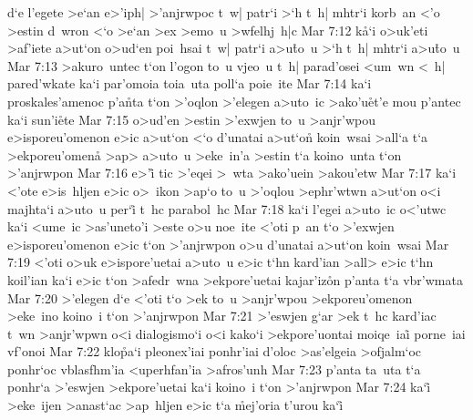 d`e
l'egete
>e`an
e>'iph|
>'anjrwpoc
t~w|
patr`i
>`h
t~h|
mhtr`i
korb~an
<'o
>estin
d~wron
<`o
>e`an
>ex
>emo~u
>wfelhj~h|c\bibvsend
\vs Mar 7:12
k\r{a}`i
o>uk'eti
>af'iete
a>ut`on
o>ud`en
poi~hsai
t~w|
patr`i
a>u\r{t}o~u
>`h
t~h|
mhtr`i
a>u\r{t}o~u\bibvsend
\vs Mar 7:13
>akuro~untec
t`on
l'ogon
to~u
vjeo~u
t~h|
parad'osei
<um~wn
<~h|
pared'wkate
ka`i
par'omoia
toia~uta
poll`a
poie~ite\bibvsend
\vs Mar 7:14
ka`i
proskales'amenoc
p'a\r{n}ta
t`on
>'oqlon
>'elegen
a>uto~ic
>ako'u\r{e}t'e
mou
p'antec
ka`i
sun'i\r{e}te\bibvsend
{}
\vs Mar 7:15
o>ud'en
>estin
>'exwjen
to~u
>anjr'wpou
e>isporeu'omenon
e>ic
a>ut`on
<`o
d'unatai
a>ut`on\r{}
koin~wsai
>all`a
t`a
>ekporeu'omena\r{}
>ap>
a>uto~u
>eke~in'a
>estin
t`a
koino~unta
t`on
>'anjrwpon\bibvsend
\vs Mar 7:16
e>'i\r{}
tic
>'eqei
>~wta
>ako'uein
>akou'etw\bibvsend
\vs Mar 7:17
ka`i
<'ote
e>is~hljen
e>ic
o>~ikon
>ap`o
to~u
>'oqlou
>ephr'wtwn
a>ut`on
o<i
majhta`i
a>uto~u
per`i\r{}
t~hc
parabol~hc\bibvsend
\vs Mar 7:18
ka`i
l'egei
a>uto~ic
o<'utwc
ka`i
<ume~ic
>as'uneto'i
>este
o>u
noe~ite
<'oti
p~an
t`o
>'exwjen
e>isporeu'omenon
e>ic
t`on
>'anjrwpon
o>u
d'unatai
a>ut`on
koin~wsai\bibvsend
\vs Mar 7:19
<'oti
o>uk
e>ispore'uetai
a>uto~u
e>ic
t`hn
kard'ian
>all>
e>ic
t`hn
koil'ian
ka`i
e>ic
t`on
>afedr~wna
>ekpore'uetai
kajar'iz\r{o}n
p'anta
t`a
vbr'wmata\bibvsend
\vs Mar 7:20
>'elegen
d`e
<'oti
t`o
>ek
to~u
>anjr'wpou
>ekporeu'omenon
>eke~ino
koino~i
t`on
>'anjrwpon\bibvsend
\vs Mar 7:21
>'eswjen
g`ar
>ek
t~hc
kard'iac
t~wn
>anjr'wpwn
o<i
dialogismo`i
o<i
kako`i
>ekpore'uontai
moiqe~iai\r{}
porne~iai
vf'onoi\bibvsend
\vs Mar 7:22
klo\r{p}a`i
pleonex'iai
ponhr'iai
d'oloc
>as'elgeia
>ofjalm`oc
ponhr`oc
vblasfhm'ia
<uperhfan'ia
>afros'unh\bibvsend
\vs Mar 7:23
p'anta
ta~uta
t`a
ponhr`a
>'eswjen
>ekpore'uetai
ka`i
koino~i
t`on
>'anjrwpon\bibvsend
\vs Mar 7:24
ka`i\r{}
>eke~ijen
>anast`ac
>ap~hljen
e>ic
t`a
\r{m}ej'oria
t'urou
ka`i\r{}
